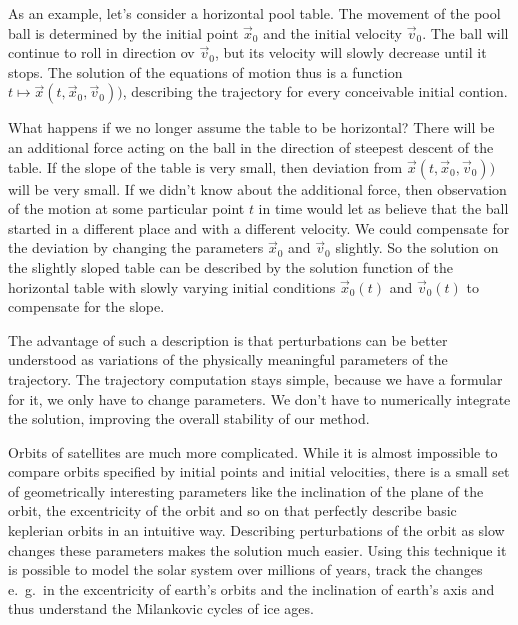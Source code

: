 \begin{beispiel}
As an example, let's consider a horizontal pool table.
The movement of the pool ball is determined by the initial
point $\vec{x}_0$ and the initial velocity $\vec{v}_0$.
The ball will continue to roll in direction ov $\vec{v}_0$, but
its velocity will slowly decrease until it stops.
The solution of the equations of motion thus is a function
$t\mapsto \vec x(t, \vec x_0, \vec v_0))$,
describing the trajectory for every conceivable initial contion.

What happens if we no longer assume the table to be horizontal?
There will be an additional force acting on the ball in the
direction of steepest descent of the table.
If the slope of the table is very small, then deviation from
$\vec x(t,\vec x_0,\vec v_0))$ will be very small.
If we didn't know about the additional force, then observation
of the motion at some particular point $t$ in time would let
as believe that the ball started in a different place and with
a different velocity.
We could compensate for the deviation by changing the parameters
$\vec x_0$ and $\vec v_0$ slightly.
So the solution on the slightly sloped table can be described by the
solution function of the horizontal table with slowly varying
initial conditions $\vec x_0(t)$ and $\vec v_0(t)$ to compensate
for the slope.
\end{beispiel}

The advantage of such a description is that perturbations can
be better understood as variations of the physically meaningful
parameters of the trajectory.
The trajectory computation stays simple, because we have a
formular for it, we only have to change parameters.
We don't have to numerically integrate the solution, improving
the overall stability of our method.

Orbits of satellites are much more complicated.
While it is almost impossible to compare orbits specified
by initial points and initial velocities, there is a small set
of geometrically interesting parameters like the inclination of
the plane of the orbit, the excentricity of the orbit and so on
that perfectly describe basic keplerian orbits in an intuitive way.
Describing perturbations of the orbit as slow changes these
parameters makes the solution much easier.
Using this technique it is possible to model the solar system
over millions of years, track the changes e.~g.~in the excentricity
of earth's orbits and the inclination of earth's axis and thus
understand the Milankovic cycles of ice ages.

